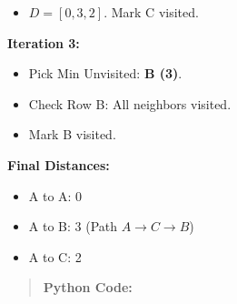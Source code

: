 \documentclass[
  letterpaper,
  DIV=11,
  numbers=noendperiod]{scrreprt}
\providecommand{\tightlist}{%
  \setlength{\itemsep}{0pt}\setlength{\parskip}{0pt}}
\begin{document}
\begin{itemize}
\tightlist
\item
  \(D = [0, 3, 2]\). Mark C visited.
\end{itemize}

\textbf{Iteration 3:}

\begin{itemize}
\tightlist
\item
  Pick Min Unvisited: \textbf{B (3)}.
\item
  Check Row B: All neighbors visited.
\item
  Mark B visited.
\end{itemize}

\textbf{Final Distances:}

\begin{itemize}
\tightlist
\item
  A to A: 0
\item
  A to B: 3 (Path \(A \to C \to B\))
\item
  A to C: 2
\end{itemize}

\begin{quote}
\textbf{Python Code:}
\end{quote}
\end{document}
